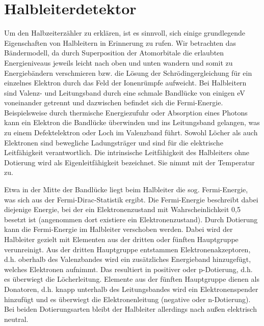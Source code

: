 \documentclass[bigchapter,colorback,accentcolor=tud4b,linedtoc,11pt]{tudreport}
\begin{document}
\section{Halbleiterdetektor}

Um den Halbzeiterzähler zu erklären, ist es sinnvoll, sich einige grundlegende Eigenschaften von Halbleitern in Erinnerung zu rufen. Wir betrachten das Bändermodell, da durch Superposition der Atomorbitale die erlaubten Energieniveaus jeweils leicht nach oben und unten wandern und somit zu Energiebändern verschmieren bzw. die Lösung der Schrödingergleichung für ein einzelnes Elektron durch das Feld der Ionenrümpfe aufweicht. Bei Halbleitern sind Valenz- und Leitungsband durch eine schmale Bandlücke von einigen eV voneinander getrennt und dazwischen befindet sich die Fermi-Energie. Beispielsweise durch thermische Energiezufuhr oder Absorption eines Photons kann ein Elektron die Bandlücke überwinden und ins Leitungsband gelangen, was zu einem Defektelektron oder Loch im Valenzband führt. Sowohl Löcher als auch Elektronen sind bewegliche Ladungsträger und sind für die elektrische Leitfähigkeit  verantwortlich. Die intrinsische Leitfähigkeit des Halbleiters ohne Dotierung wird als Eigenleitfähigkeit bezeichnet. Sie nimmt mit der Temperatur zu. 

Etwa in der Mitte der Bandlücke liegt beim Halbleiter die sog. Fermi-Energie, was sich aus der Fermi-Dirac-Statistik ergibt. Die Fermi-Energie beschreibt dabei diejenige Energie, bei der ein Elektronenzustand mit Wahrscheinlichkeit 0,5 besetzt ist (angenommen dort existiere ein Elektronenzustand). Durch Dotierung kann die Fermi-Energie im Halbleiter verschoben werden. Dabei wird der Halbleiter gezielt mit Elementen aus der dritten oder fünften Hauptgruppe verunreinigt. Aus der dritten Hauptgruppe entstammen Elektronenakzeptoren, d.h. oberhalb des Valenzbandes wird ein zusätzliches Energieband hinzugefügt, welches Elektronen aufnimmt. Das resultiert in positiver oder p-Dotierung, d.h. es überwiegt die Löcherleitung. Elemente aus der fünften Hauptgruppe dienen als Donatoren, d.h. knapp unterhalb des Leitungsbandes wird ein Elektronenspender hinzufügt und es überwiegt die Elektronenleitung (negative oder n-Dotierung). Bei beiden Dotierungsarten bleibt der Halbleiter allerdings nach außen elektrisch neutral.
\end{document}
